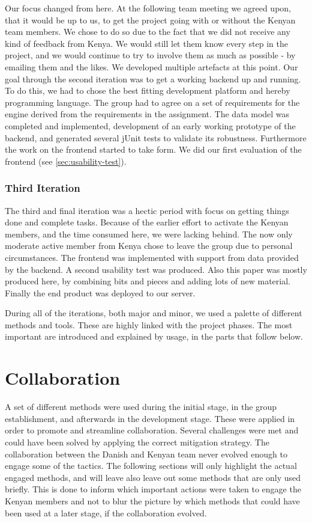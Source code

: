 Our focus changed from here. At the following team meeting we agreed upon, that it would be up to us, to get the project going with or without the Kenyan team members. We chose to do so due to the fact that we did not receive any kind of feedback from Kenya. We would still let them know every step in the project, and we would continue to try to involve them as much as possible - by emailing them and the likes. We developed multiple artefacts at this point. Our goal through the second iteration was to get a working backend up and running. To do this, we had to chose the best fitting development platform and hereby programming language. The group had to agree on a set of requirements for the engine derived from the requirements in the assignment. The data model was completed and implemented, development of an early working prototype of the backend, and generated several jUnit tests to validate its robustness. Furthermore the work on the frontend started to take form. We did our first evaluation of the frontend (see \ref{sec:usability-test}).

\subsubsection{Third Iteration}
The third and final iteration was a hectic period with focus on getting things done and complete tasks. Because of the earlier effort to activate the Kenyan members, and the time consumed here, we were lacking behind. The now only moderate active member from Kenya chose to leave the group due to personal circumstances. The frontend was implemented with support from data provided by the backend. A second usability test was produced. Also this paper was mostly produced here, by combining bits and pieces and adding lots of new material. Finally the end product was deployed to our server.

During all of the iterations, both major and minor, we used a palette of different methods and tools. These are highly linked with the project phases. The most important are introduced and explained by usage, in the parts that follow below.

\section{Collaboration} \label{sec:collaboration}
A set of different methods were used during the initial stage, in the group establishment, and afterwards in the development stage. These were applied in order to promote and streamline collaboration. Several challenges were met and could have been solved by applying the correct mitigation strategy. The collaboration between the Danish and Kenyan team never evolved enough to engage some of the tactics. The following sections will only highlight the actual engaged methods, and will leave also leave out some methods that are only used briefly. This is done to inform which important actions were taken to engage the Kenyan members and not to blur the picture by which methods that could have been used at a later stage, if the collaboration evolved. 

